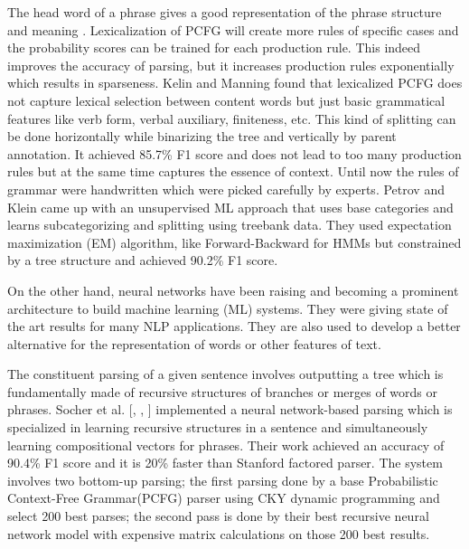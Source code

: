 \documentclass[a4paper, 11pt]{article}
\begin{document}
The head word of a phrase gives a good representation of the phrase structure and meaning \parencite{Charniak_1997}. Lexicalization of PCFG \parencite{charniak2000} will create more rules of specific cases and the probability scores can be trained for each production rule. This indeed improves the accuracy of parsing, but it increases production rules exponentially which results in sparseness. Kelin and Manning \parencite{kleinunlexical} found that lexicalized PCFG does not capture lexical selection between content words but just basic grammatical features like verb form, verbal auxiliary, finiteness, etc. This kind of splitting can be done horizontally while binarizing the tree and vertically by parent annotation. It achieved 85.7\% F1 score and does not lead to too many production rules but at the same time captures the essence of context. Until now the rules of grammar were handwritten which were picked carefully by experts. Petrov and Klein \parencite{petrov2006} came up with an unsupervised ML approach that uses base categories and learns subcategorizing and splitting using treebank data. They used expectation maximization (EM) algorithm, like Forward-Backward for HMMs but constrained by a tree structure and achieved 90.2\% F1 score. 

On the other hand, neural networks have been raising and becoming a prominent architecture to build machine learning (ML) systems. They were giving state of the art results for many NLP applications. They are also used to develop a better alternative for the representation of words or other features of text. 

The constituent parsing of a given sentence involves outputting a tree which is fundamentally made of recursive structures of branches or merges of words or phrases. Socher et al. [\parencite*{RichardSocher2011}, \parencite*{Socher}, \parencite*{Sochera}] implemented a neural network-based parsing which is specialized in learning recursive structures in a sentence and simultaneously learning compositional vectors for phrases. Their work achieved an accuracy of 90.4\% F1 score and it is 20\% faster than Stanford factored parser. The system involves two bottom-up parsing; the first parsing done by a base Probabilistic Context-Free Grammar(PCFG) parser using CKY dynamic programming and select 200 best parses; the second pass is done by their best recursive neural network model with expensive matrix calculations on those 200 best results. 

\end{document}
